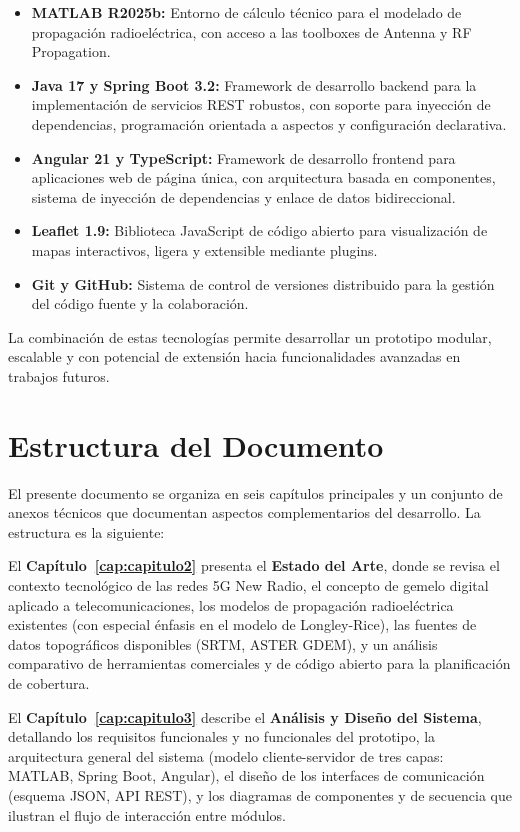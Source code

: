 \begin{itemize}
    \item \textbf{MATLAB R2025b:} Entorno de cálculo técnico para el modelado de propagación radioeléctrica, con acceso a las toolboxes de Antenna y RF Propagation.
    \item \textbf{Java 17 y Spring Boot 3.2:} Framework de desarrollo backend para la implementación de servicios REST robustos, con soporte para inyección de dependencias, programación orientada a aspectos y configuración declarativa.
    \item \textbf{Angular 21 y TypeScript:} Framework de desarrollo frontend para aplicaciones web de página única, con arquitectura basada en componentes, sistema de inyección de dependencias y enlace de datos bidireccional.
    \item \textbf{Leaflet 1.9:} Biblioteca JavaScript de código abierto para visualización de mapas interactivos, ligera y extensible mediante plugins.
    \item \textbf{Git y GitHub:} Sistema de control de versiones distribuido para la gestión del código fuente y la colaboración.
\end{itemize}

La combinación de estas tecnologías permite desarrollar un prototipo modular, escalable y con potencial de extensión hacia funcionalidades avanzadas en trabajos futuros.

\section{Estructura del Documento}
\label{sec:estructura}

El presente documento se organiza en seis capítulos principales y un conjunto de anexos técnicos que documentan aspectos complementarios del desarrollo. La estructura es la siguiente:

El \textbf{Capítulo~\ref{cap:capitulo2}} presenta el \textbf{Estado del Arte}, donde se revisa el contexto tecnológico de las redes 5G New Radio, el concepto de gemelo digital aplicado a telecomunicaciones, los modelos de propagación radioeléctrica existentes (con especial énfasis en el modelo de Longley-Rice), las fuentes de datos topográficos disponibles (SRTM, ASTER GDEM), y un análisis comparativo de herramientas comerciales y de código abierto para la planificación de cobertura.

El \textbf{Capítulo~\ref{cap:capitulo3}} describe el \textbf{Análisis y Diseño del Sistema}, detallando los requisitos funcionales y no funcionales del prototipo, la arquitectura general del sistema (modelo cliente-servidor de tres capas: MATLAB, Spring Boot, Angular), el diseño de los interfaces de comunicación (esquema JSON, API REST), y los diagramas de componentes y de secuencia que ilustran el flujo de interacción entre módulos.

